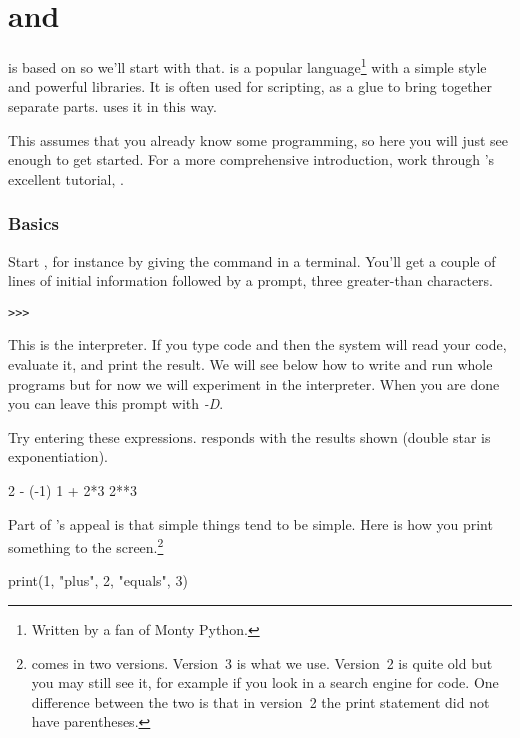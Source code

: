 \chapter{\python{} and \Sage{}}

\Sage{} is based on \python{} so we'll start with that.
\python{} is a popular language\footnote{Written by a fan of
Monty Python.} 
with a simple style and powerful libraries.
It is often used for scripting, as a glue to bring together separate parts.
\Sage{} uses it in this way.

This assumes 
that you already know some programming, so
here you will just see enough \python{} to get started. 
For a more comprehensive introduction, work through \python's excellent tutorial,
\cite{PythonTeam19b}.



\subsection{Basics}
Start \python, for instance by giving the command
in a terminal.
You'll get a couple of lines of initial
information followed by a prompt, three greater-than
characters.
\begin{lstlisting}[style=python]
>>>   
\end{lstlisting}
This is the \python{} interpreter.
If you type 
\python{} code and  then the system
will read your code, evaluate it, and print the result.
We will see below how to write and run whole programs
but for now we will experiment in the interpreter.
When you are done you can 
leave this prompt with \textit{-D}.

Try entering these expressions.
\python{} responds with the results shown
(double star is exponentiation).
\begin{pythonconsole}
2 - (-1)
1 + 2*3
2**3  
\end{pythonconsole}

Part of \python's appeal is that simple things tend to be simple.
Here is how you print something to the screen.\footnote{%
  \protect\python{} comes in two versions.
  Version~3 is what we use.
  Version~2 is quite old but you may still see it, for example if
  you look in a search engine for code.
  One difference between the two is that in version~2 the
  print statement did not have parentheses.}
\begin{pythonconsole}
print(1, "plus", 2, "equals", 3)
\end{pythonconsole}

